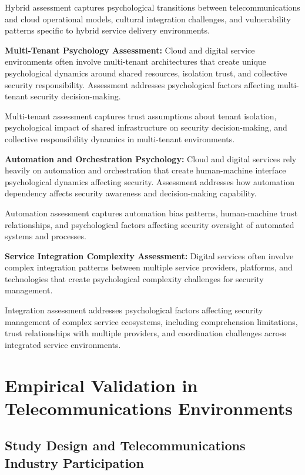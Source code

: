 \documentclass[10pt, twocolumn]{article}
\begin{document}
Hybrid assessment captures psychological transitions between telecommunications and cloud operational models, cultural integration challenges, and vulnerability patterns specific to hybrid service delivery environments.

\textbf{Multi-Tenant Psychology Assessment:} Cloud and digital service environments often involve multi-tenant architectures that create unique psychological dynamics around shared resources, isolation trust, and collective security responsibility. Assessment addresses psychological factors affecting multi-tenant security decision-making.

Multi-tenant assessment captures trust assumptions about tenant isolation, psychological impact of shared infrastructure on security decision-making, and collective responsibility dynamics in multi-tenant environments.

\textbf{Automation and Orchestration Psychology:} Cloud and digital services rely heavily on automation and orchestration that create human-machine interface psychological dynamics affecting security. Assessment addresses how automation dependency affects security awareness and decision-making capability.

Automation assessment captures automation bias patterns, human-machine trust relationships, and psychological factors affecting security oversight of automated systems and processes.

\textbf{Service Integration Complexity Assessment:} Digital services often involve complex integration patterns between multiple service providers, platforms, and technologies that create psychological complexity challenges for security management.

Integration assessment addresses psychological factors affecting security management of complex service ecosystems, including comprehension limitations, trust relationships with multiple providers, and coordination challenges across integrated service environments.

\section{Empirical Validation in Telecommunications Environments}

\subsection{Study Design and Telecommunications Industry Participation}
\end{document}
